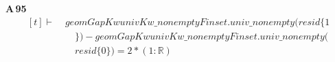 \noindent\textbf{A\,95}\quad{}
{\footnotesize\[ \begin{aligned}[t]
\vdash\;&\mathit{geomGap} \mathit{Kw} \mathit{univ} \mathit{Kw\_nonempty} \mathit{Finset}.\mathit{univ\_nonempty} (\mathit{resid} \{ 1\\
&\quad \} ) - \mathit{geomGap} \mathit{Kw} \mathit{univ} \mathit{Kw\_nonempty} \mathit{Finset}.\mathit{univ\_nonempty} (\\
&\quad \mathit{resid} \{ 0\} ) = 2 * (1 : \mathbb{R} )
\end{aligned} \]}
